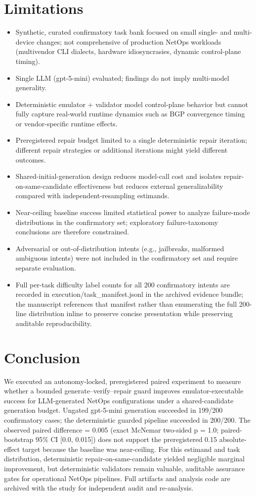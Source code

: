 \documentclass[conference]{IEEEtran}
\begin{document}
\section{Limitations}
\begin{itemize}
\item Synthetic, curated confirmatory task bank focused on small single- and multi-device changes; not comprehensive of production NetOps workloads (multivendor CLI dialects, hardware idiosyncrasies, dynamic control-plane timing).
\item Single LLM (gpt-5-mini) evaluated; findings do not imply multi-model generality.
\item Deterministic emulator + validator model control-plane behavior but cannot fully capture real-world runtime dynamics such as BGP convergence timing or vendor-specific runtime effects.
\item Preregistered repair budget limited to a single deterministic repair iteration; different repair strategies or additional iterations might yield different outcomes.
\item Shared-initial-generation design reduces model-call cost and isolates repair-on-same-candidate effectiveness but reduces external generalizability compared with independent-resampling estimands.
\item Near-ceiling baseline success limited statistical power to analyze failure-mode distributions in the confirmatory set; exploratory failure-taxonomy conclusions are therefore constrained.
\item Adversarial or out-of-distribution intents (e.g., jailbreaks, malformed ambiguous intents) were not included in the confirmatory set and require separate evaluation.
\item Full per-task difficulty label counts for all 200 confirmatory intents are recorded in execution/task\_manifest.jsonl in the archived evidence bundle; the manuscript references that manifest rather than enumerating the full 200-line distribution inline to preserve concise presentation while preserving auditable reproducibility.
\end{itemize}

\section{Conclusion}
We executed an autonomy-locked, preregistered paired experiment to measure whether a bounded generate--verify--repair guard improves emulator-executable success for LLM-generated NetOps configurations under a shared-candidate generation budget. Ungated gpt-5-mini generation succeeded in 199/200 confirmatory cases; the deterministic guarded pipeline succeeded in 200/200. The observed paired difference = 0.005 (exact McNemar two-sided p = 1.0; paired-bootstrap 95\% CI [0.0, 0.015]) does not support the preregistered 0.15 absolute-effect target because the baseline was near-ceiling. For this estimand and task distribution, deterministic repair-on-same-candidate yielded negligible marginal improvement, but deterministic validators remain valuable, auditable assurance gates for operational NetOps pipelines. Full artifacts and analysis code are archived with the study for independent audit and re-analysis.
\end{document}
